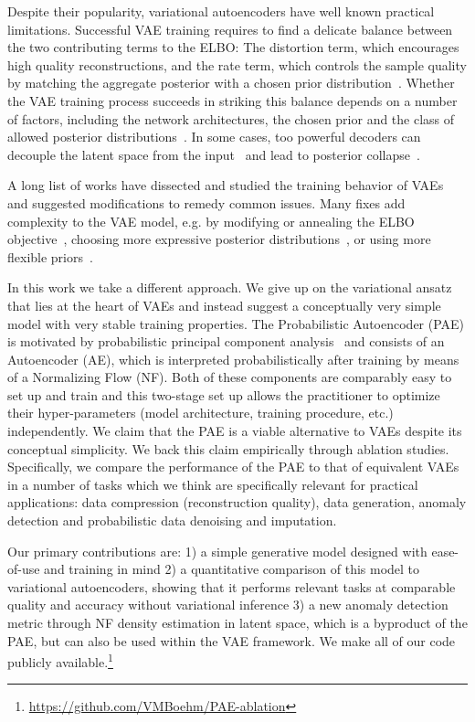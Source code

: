 \documentclass[10pt]{article} \usepackage[accepted]{tmlr}
\begin{document}
Despite their popularity, variational autoencoders have well known practical limitations. Successful VAE training requires to find a delicate balance between the two contributing terms to the ELBO: The distortion term, which encourages high quality reconstructions, and the rate term, which controls the sample quality by matching the aggregate posterior with a chosen prior distribution~\citep{FixElbo}. Whether the VAE training process succeeds in striking this balance depends on a number of factors, including the network architectures, the chosen prior and the class of allowed posterior distributions~\citep{Hoffman2016ELBO}. In some cases, too powerful decoders can decouple the latent space from the input~\citep{BowmanVVDJB16, KSDDSSA17} and lead to posterior collapse~\citep{OordVK17}.

A long list of works have dissected and studied the training behavior of VAEs~\citep{FixElbo, Hoffman2016ELBO} and suggested modifications to remedy common issues. Many fixes add complexity to the VAE model, e.g. by modifying or annealing the ELBO objective~\citep{BowmanVVDJB16, Alemi2016, beta-VAE, Makhzani2015}, choosing more expressive posterior distributions~\citep{KingmaSW16,RezendeM15, SalimansKW15, TranRB15}, or using more flexible priors~\citep{BauerM19,KSDDSSA17, TomczakW17Vamp}.

In this work we take a different approach. We give up on the variational ansatz that lies at the heart of VAEs and instead suggest a conceptually very simple model with very stable training properties. The Probabilistic Autoencoder (PAE) is motivated by probabilistic principal component analysis~\citep{TippingBishop1999} and consists of an Autoencoder (AE), which is interpreted probabilistically after training by means of a Normalizing Flow (NF). Both of these components are comparably easy to set up and train and this two-stage set up allows the practitioner to optimize their hyper-parameters (model architecture, training procedure, etc.) independently. We claim that the PAE is a viable alternative to VAEs despite its conceptual simplicity. We back this claim empirically through ablation studies. Specifically, we compare the performance of the PAE to that of equivalent VAEs in a number of tasks which we think are specifically relevant for practical applications: data compression (reconstruction quality), data generation, anomaly detection and probabilistic data denoising and imputation. 

Our primary contributions are: 1) a simple generative model designed with ease-of-use and training in mind 2) a quantitative comparison of this model to variational autoencoders, showing that it performs relevant tasks at comparable quality and accuracy without variational
inference 3) a new anomaly detection metric through NF density estimation in latent space, which is a byproduct of the PAE, but can also be used within the VAE framework. We make all of our code publicly available.\footnote{\url{https://github.com/VMBoehm/PAE-ablation}}
\end{document}
